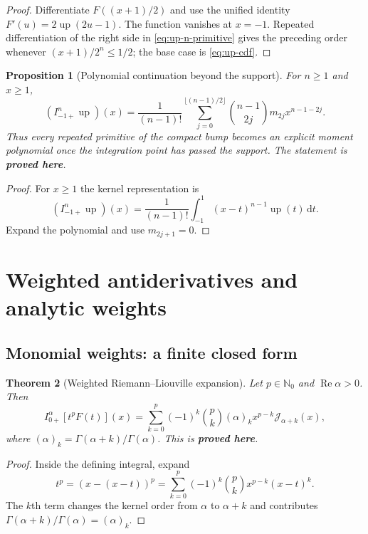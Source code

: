 \documentclass[11pt]{article}
\newcommand{\statusproved}{\textcolor{statusgreen}{\textbf{proved here}}}
\newtheorem{theorem}{Theorem}[section]
\newtheorem{proposition}[theorem]{Proposition}
\theoremstyle{definition}
\theoremstyle{remark}
\newcommand{\N}{\mathbb N}
\newcommand{\dd}{\,\mathrm d}
\newcommand{\Up}{\operatorname{up}}
\newcommand{\Ree}{\operatorname{Re}}
\newcommand{\poch}[2]{(#1)_{#2}}
\newcommand{\J}{\mathcal J}
\begin{document}
\begin{proof}
Differentiate $F((x+1)/2)$ and use the unified identity
$F'(u)=2\Up(2u-1)$.  The function vanishes at $x=-1$.  Repeated differentiation of the
right side in \cref{eq:up-n-primitive} gives the preceding order whenever
$(x+1)/2^n\le1/2$; the base case is \cref{eq:up-cdf}.
\end{proof}

\begin{proposition}[Polynomial continuation beyond the support]
\label{prop:up-polynomial-tail}
For $n\ge1$ and $x\ge1$,
\begin{equation}
 (I_{-1+}^{n}\Up)(x)=\frac1{(n-1)!}
 \sum_{j=0}^{\lfloor(n-1)/2\rfloor}
 \binom{n-1}{2j}m_{2j}x^{n-1-2j}.
 \label{eq:up-polynomial-tail}
\end{equation}
Thus every repeated primitive of the compact bump becomes an explicit moment polynomial once
the integration point has passed the support.  The statement is \statusproved.
\end{proposition}

\begin{proof}
For $x\ge1$ the kernel representation is
\[
 (I_{-1+}^{n}\Up)(x)=\frac1{(n-1)!}\int_{-1}^{1}(x-t)^{n-1}\Up(t)\dd t.
\]
Expand the polynomial and use $m_{2j+1}=0$.
\end{proof}

\section{Weighted antiderivatives and analytic weights}
\label{sec:weighted}

\subsection{Monomial weights: a finite closed form}

\begin{theorem}[Weighted Riemann--Liouville expansion]
\label{thm:weighted-RL}
Let $p\in\N_0$ and $\Ree\alpha>0$.  Then
\begin{equation}
 I_{0+}^{\alpha}[t^pF(t)](x)
 =\sum_{k=0}^{p}(-1)^k\binom pk\poch{\alpha}{k}
 x^{p-k}\J_{\alpha+k}(x),
 \label{eq:weighted-RL}
\end{equation}
where $\poch{\alpha}{k}=\Gamma(\alpha+k)/\Gamma(\alpha)$.  This is \statusproved.
\end{theorem}

\begin{proof}
Inside the defining integral, expand
\[
 t^p=(x-(x-t))^p
 =\sum_{k=0}^p(-1)^k\binom pkx^{p-k}(x-t)^k.
\]
The $k$th term changes the kernel order from $\alpha$ to $\alpha+k$ and contributes
$\Gamma(\alpha+k)/\Gamma(\alpha)=\poch{\alpha}{k}$.
\end{proof}
\end{document}

